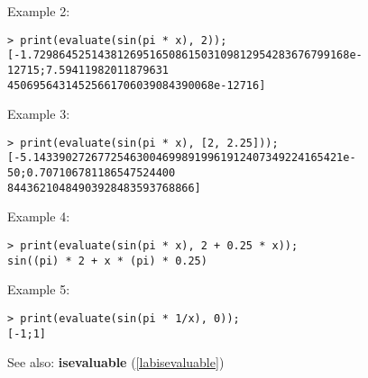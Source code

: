 \noindent Example 2: 
\begin{center}\begin{minipage}{15cm}\begin{Verbatim}[frame=single]
> print(evaluate(sin(pi * x), 2));
[-1.7298645251438126951650861503109812954283676799168e-12715;7.59411982011879631
45069564314525661706039084390068e-12716]
\end{Verbatim}
\end{minipage}\end{center}
\noindent Example 3: 
\begin{center}\begin{minipage}{15cm}\begin{Verbatim}[frame=single]
> print(evaluate(sin(pi * x), [2, 2.25]));
[-5.143390272677254630046998919961912407349224165421e-50;0.707106781186547524400
84436210484903928483593768866]
\end{Verbatim}
\end{minipage}\end{center}
\noindent Example 4: 
\begin{center}\begin{minipage}{15cm}\begin{Verbatim}[frame=single]
> print(evaluate(sin(pi * x), 2 + 0.25 * x));
sin((pi) * 2 + x * (pi) * 0.25)
\end{Verbatim}
\end{minipage}\end{center}
\noindent Example 5: 
\begin{center}\begin{minipage}{15cm}\begin{Verbatim}[frame=single]
> print(evaluate(sin(pi * 1/x), 0));
[-1;1]
\end{Verbatim}
\end{minipage}\end{center}
See also: \textbf{isevaluable} (\ref{labisevaluable})
